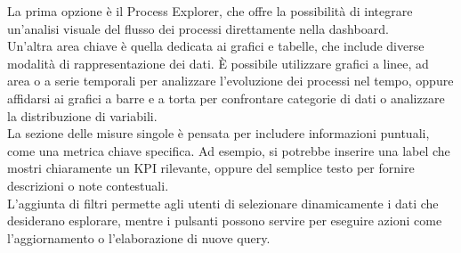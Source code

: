 \documentclass{article}
\begin{document}
La prima opzione è il Process Explorer, che offre la possibilità di integrare un'analisi visuale del flusso dei processi direttamente nella dashboard.\\
Un’altra area chiave è quella dedicata ai grafici e tabelle, che include diverse modalità di rappresentazione dei dati. È possibile utilizzare grafici a linee, ad area o a serie temporali per analizzare l'evoluzione dei processi nel tempo, oppure affidarsi ai grafici a barre e a torta per confrontare categorie di dati o analizzare la distribuzione di variabili.\\
La sezione delle misure singole è pensata per includere informazioni puntuali, come una metrica chiave specifica. Ad esempio, si potrebbe inserire una label che mostri chiaramente un KPI rilevante, oppure del semplice testo per fornire descrizioni o note contestuali.\\
L’aggiunta di filtri permette agli utenti di selezionare dinamicamente i dati che desiderano esplorare, mentre i pulsanti possono servire per eseguire azioni come l’aggiornamento o l’elaborazione di nuove query.
\end{document}

